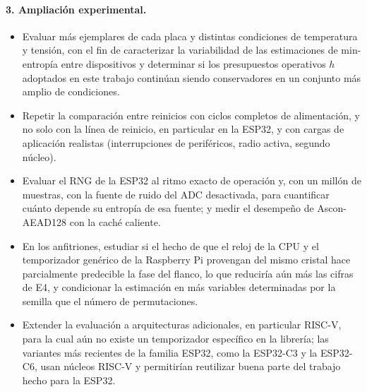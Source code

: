 \paragraph{3. Ampliación experimental.}
\begin{itemize}
    \item Evaluar más ejemplares de cada placa y distintas condiciones de temperatura y tensión, con el fin de caracterizar la variabilidad de las estimaciones de min-entropía entre dispositivos y determinar si los presupuestos operativos $h$ adoptados en este trabajo continúan siendo conservadores en un conjunto más amplio de condiciones.
    \item Repetir la comparación entre reinicios con ciclos completos de alimentación, y no solo con la línea de reinicio, en particular en la ESP32, y con cargas de aplicación realistas (interrupciones de periféricos, radio activa, segundo núcleo).
    \item Evaluar el RNG de la ESP32 al ritmo exacto de operación y, con un millón de muestras, con la fuente de ruido del ADC desactivada, para cuantificar cuánto depende su entropía de esa fuente; y medir el desempeño de Ascon-AEAD128 con la caché caliente.
    \item En los anfitriones, estudiar si el hecho de que el reloj de la CPU y el temporizador genérico de la Raspberry Pi provengan del mismo cristal hace parcialmente predecible la fase del flanco, lo que reduciría aún más las cifras de E4, y condicionar la estimación en más variables determinadas por la semilla que el número de permutaciones.
    \item Extender la evaluación a arquitecturas adicionales, en particular RISC-V, para la cual aún no existe un temporizador específico en la librería; las variantes más recientes de la familia ESP32, como la ESP32-C3 y la ESP32-C6, usan núcleos RISC-V y permitirían reutilizar buena parte del trabajo hecho para la ESP32.
\end{itemize}
